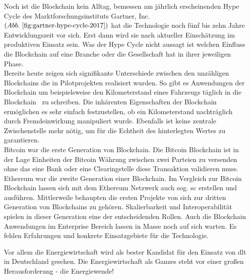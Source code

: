 Noch ist die Blockchain kein Alltag, bemessen am jährlich erscheinenden Hype Cycle des Marktforschungsinstituts Gartner, Inc. $( Abb.~ \ref{fig:gartner-hype-cycle-2017} )$ hat die Technologie noch fünf bis zehn Jahre Entwicklungszeit vor sich. Erst dann wird sie nach aktueller Einschätzung im produktiven Einsatz sein. Was der Hype Cycle nicht aussagt ist welchen Einfluss die Blockchain auf eine Branche oder die Gesellschaft hat in ihrer jeweiligen Phase.\\

Bereits heute zeigen sich signifikante Unterschiede zwischen den unzähligen Blockchains die in Pilotprojekten realisiert wurden. So gibt es Anwendungen der Blockchain um beispielsweise den Kilometerstand eines Fahrzeugs täglich \glqq in die Blockchain\grqq~ zu schreiben. Die inhärenten Eigenschaften der Blockchain ermöglichen es sehr einfach festzustellen, ob ein Kilometerstand nachträglich durch Fremdeinwirkung manipuliert wurde. Ebenfalls ist keine zentrale Zwischenstelle mehr nötig, um für die Echtheit des hinterlegten Wertes zu garantieren. \cite{carVertical}\\

Bitcoin war die erste Generation von Blockchain. Die Bitcoin Blockchain ist in der Lage Einheiten der Bitcoin Währung zwischen zwei Parteien zu versenden ohne das eine Bank oder eine Clearingstelle diese Transaktion validieren muss. \cite[vgl.]{Nakamoto2009} Ethereum war die zweite Generation einer Blockchain. Im Vergleich zur Bitcoin Blockchain lassen sich mit dem Ethereum Netzwerk auch sog. \ac{sc} erstellen und ausführen.\cite[vgl.]{Buterin2014} Mittlerweile behaupten die ersten Projekte von sich zur dritten Generation von Blockchains zu gehören. Skalierbarkeit und Interoperabilität spielen in dieser Generation eine der entscheidenden Rollen. \cite[vgl.]{Cardano} Auch die Blockchain Anwendungen im Enterprise Bereich lassen in Masse noch auf sich warten. Es fehlen Erfahrungen und konkrete Einsatzgebiete für die Technologie.

Vor allem die Energiewirtschaft wird als bester Kandidat für den Einsatz von \ac{dlt} in Deutschland gesehen. \cite[vgl.]{Energie-Agentur2018} Die Energiewirtschaft als Ganzes steht vor einer großen Herausforderung -  die Energiewende!

\newpage